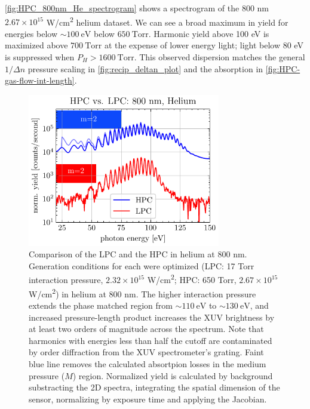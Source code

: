 \cref{fig:HPC_800nm_He_spectrogram} shows a spectrogram of the 800 nm $2.67 \times 10^{15}$ W/cm\textsuperscript{2} helium dataset. We can see a broad maximum in yield for energies below $\sim 100 \ \textrm{eV}$ below $650 \ \textrm{Torr}$. Harmonic yield above 100 eV is maximized above $700 \ \textrm{Torr}$ at the expense of lower energy light; light below 80 eV is suppressed when $P_H > 1600 \ \textrm{Torr}$. This observed dispersion matches the general $1/\Delta n$ pressure scaling in \cref{fig:recip_deltan_plot} and the absorption in \cref{fig:HPC-gas-flow-int-length}.

\begin{figure}
	\centering
	\includegraphics[width=0.75\textwidth]{figures/chap3/HPC_vs_LPC_800He.pdf}
	\caption{Comparison of the LPC and the HPC in helium at 800 nm. Generation conditions for each were optimized (LPC: 17 Torr interaction pressure, $2.32\times10^{15}$ W/cm\textsuperscript{2}; HPC: 650 Torr, $2.67 \times 10^{15}$ W/cm\textsuperscript{2}) in helium at 800 nm. The higher interaction pressure extends the phase matched region from $ \sim 110 \ \textrm{eV}$ to $\sim 130 \ \textrm{eV}$, and increased pressure-length product increases the XUV brightness by at least two orders of magnitude across the spectrum. Note that harmonics with energies less than half the cutoff are contaminated by  order diffraction from the XUV spectrometer's grating. Faint blue line removes the calculated absortpion losses in the medium pressure ($M$) region. Normalized yield is calculated by background substracting the 2D spectra, integrating the spatial dimension of the sensor, normalizing by exposure time and applying the Jacobian.}
	\label{fig:HHG-HPCvsLPCHPC}
\end{figure}

